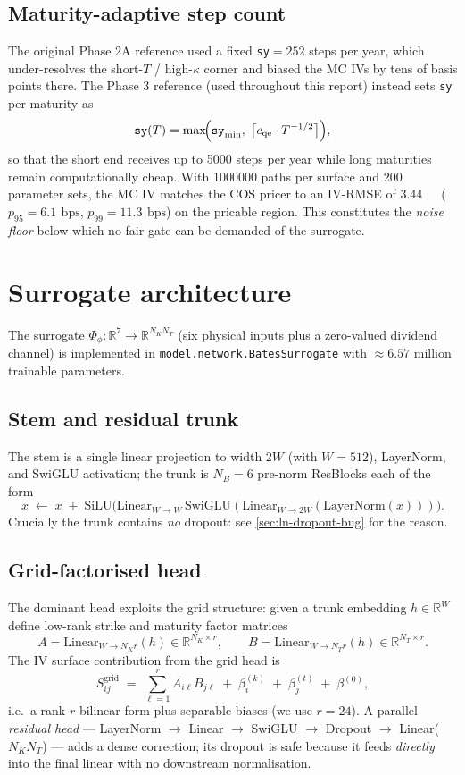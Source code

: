 \documentclass[11pt,a4paper]{article}
\newcommand{\bps}{\,\text{bps}}
\newcommand{\RR}{\mathbb{R}}
\begin{document}
\subsection{Maturity-adaptive step count}

The original Phase 2A reference used a fixed \texttt{sy}$=252$ steps
per year, which under-resolves the short-$T$ / high-$\kappa$ corner
and biased the MC IVs by tens of basis points there. The Phase 3
reference (used throughout this report) instead sets \texttt{sy}
per maturity as
\[
  \texttt{sy}(T) = \max\!\Bigl(\texttt{sy}_{\min},\;
    \bigl\lceil c_{\text{qe}} \cdot T^{-1/2}\bigr\rceil\Bigr),
\]
so that the short end receives up to \num{5000} steps per year while
long maturities remain computationally cheap.
With \num{1000000} paths per surface and \num{200} parameter sets,
the MC IV matches the COS pricer to an IV-RMSE of \SI{3.44}{\bps}
($p_{95}=\SI{6.1}{\bps}$, $p_{99}=\SI{11.3}{\bps}$) on the pricable
region. This constitutes the \emph{noise floor} below which no fair
gate can be demanded of the surrogate.

\section{Surrogate architecture}
\label{sec:model}

The surrogate $\Phi_\phi:\RR^{7}\to\RR^{N_KN_T}$
(six physical inputs plus a zero-valued dividend channel) is
implemented in \texttt{model.network.BatesSurrogate} with
$\approx6.57$ million trainable parameters.

\subsection{Stem and residual trunk}
\label{sec:stem}

The stem is a single linear projection to width $2W$ (with $W=512$),
LayerNorm, and SwiGLU activation; the trunk is $N_B=6$ pre-norm
ResBlocks each of the form
\[
  x \;\leftarrow\; x \;+\; \mathrm{SiLU}\!\bigl(
    \mathrm{Linear}_{W\to W}\,\mathrm{SwiGLU}(\mathrm{Linear}_{W\to2W}(\mathrm{LayerNorm}(x)))\bigr).
\]
Crucially the trunk contains \emph{no} dropout: see
\cref{sec:ln-dropout-bug} for the reason.

\subsection{Grid-factorised head}
\label{sec:head}

The dominant head exploits the grid structure:
given a trunk embedding $h\in\RR^W$ define low-rank strike and maturity
factor matrices
\[
  A = \mathrm{Linear}_{W\to N_K r}(h) \in \RR^{N_K\times r},\qquad
  B = \mathrm{Linear}_{W\to N_T r}(h) \in \RR^{N_T\times r}.
\]
The IV surface contribution from the grid head is
\[
  S^{\text{grid}}_{ij} \;=\; \sum_{\ell=1}^{r} A_{i\ell}B_{j\ell}
    \;+\; \beta^{(k)}_{i} \;+\; \beta^{(t)}_{j} \;+\; \beta^{(0)},
\]
i.e.\ a rank-$r$ bilinear form plus separable biases (we use $r=24$).
A parallel \emph{residual head} --- LayerNorm $\to$ Linear $\to$ SwiGLU
$\to$ Dropout $\to$ Linear($N_KN_T$) --- adds a dense correction; its
dropout is safe because it feeds \emph{directly} into the final linear
with no downstream normalisation.
\end{document}
